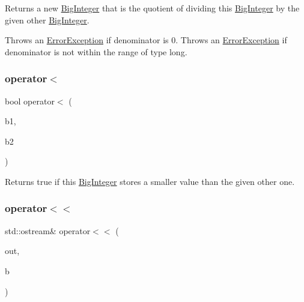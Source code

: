 Returns a new \mbox{\hyperlink{classBigInteger}{Big\+Integer}} that is the quotient of dividing this \mbox{\hyperlink{classBigInteger}{Big\+Integer}} by the given other \mbox{\hyperlink{classBigInteger}{Big\+Integer}}. 

Throws an \mbox{\hyperlink{classErrorException}{Error\+Exception}} if denominator is 0. Throws an \mbox{\hyperlink{classErrorException}{Error\+Exception}} if denominator is not within the range of type long. \mbox{\label{classBigInteger_a4dcc8676ab598fab3e5437c55b8dfaf5}} 
\subsubsection{\texorpdfstring{operator$<$}{operator<}}
{\footnotesize\ttfamily bool operator$<$ (\begin{DoxyParamCaption}\item[{const \mbox{\hyperlink{classBigInteger}{Big\+Integer}} \&}]{b1,  }\item[{const \mbox{\hyperlink{classBigInteger}{Big\+Integer}} \&}]{b2 }\end{DoxyParamCaption})\hspace{0.3cm}{\ttfamily [friend]}}



Returns true if this \mbox{\hyperlink{classBigInteger}{Big\+Integer}} stores a smaller value than the given other one. 

\mbox{\label{classBigInteger_ac88f101625fa13c9bbc286eb90eec023}} 
\subsubsection{\texorpdfstring{operator$<$$<$}{operator<<}}
{\footnotesize\ttfamily std\+::ostream\& operator$<$$<$ (\begin{DoxyParamCaption}\item[{std\+::ostream \&}]{out,  }\item[{const \mbox{\hyperlink{classBigInteger}{Big\+Integer}} \&}]{b }\end{DoxyParamCaption})\hspace{0.3cm}{\ttfamily [friend]}}

